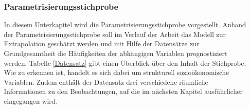 \documentclass{Vorlage}
\begin{document}
\subsubsection{Parametrisierungsstichprobe}
In diesem Unterkapitel wird die Parametrisierungsstichprobe vorgestellt. Anhand der Parametrisierungsstichprobe soll im Verlauf der Arbeit das Modell zur Extrapolation geschätzt werden und mit Hilfe der Datensätze zur Grundgesamtheit die Häufigkeiten der abhängigen Variablen prognostiziert werden.
Tabelle \ref{Datensatz} gibt einen Überblick über den Inhalt der Stichprobe. Wie zu erkennen ist, handelt es sich dabei um strukturell sozioökonomische Variablen. Zudem enthält der Datensatz drei verschiedene räumliche Informationen zu den Beobachtungen, auf die im nächsten Kapitel ausführlicher eingegangen wird.\\

\begin{table}[h]
\centering
\caption{Datensatz}
\label{Datensatz}
\end{table}
\end{document}
